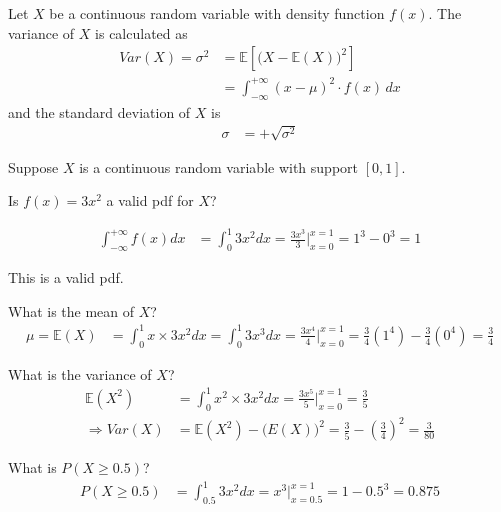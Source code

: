 \begin{definition}
Let $X$ be a continuous random variable with density function $f(x)$. 
The variance of $X$ is calculated as
\begin{align}
Var(X) = \sigma^{2} 	& = \mathbb{E}[ \big(X - \mathbb{E}(X) \big)^2 ] \\
				& = \int^{+ \infty}_{- \infty} (x - \mu)^{2} \cdot f(x) \, dx
\end{align}
\noindent
and the standard deviation of $X$ is 
\begin{align}
\sigma	& = + \sqrt{ \sigma^{2} }
\end{align}
\end{definition}

\begin{example}
Suppose $X$ is a continuous random variable with support $[0,1]$. 
\begin{benumerate}
\item Is $f(x) = 3x^2$ a valid pdf for $X$?

\begin{align*}
\int_{-\infty}^{+\infty} f(x) dx &= \int_{0}^{1} 3x^2dx 
	= \frac{3x^3}{3} \bigg|_{x=0}^{x=1} 
	= 1^{3} - 0^{3} = 1
\end{align*}

This is a valid pdf.

\item What is the mean of $X$?
\begin{align*}
\mu = \mathbb{E}(X) &= \int_{0}^{1} x \times 3 x^2 dx 
			  = \int_{0}^{1} 3 x^{3} dx 
			  = \frac{3 x^{4}}{4} \bigg|_{x=0}^{x=1}
			  = \frac{3}{4}(1^4) - \frac{3}{4}(0^4) = \frac{3}{4}
\end{align*}

\item What is the variance of $X$?
\begin{align*}
\mathbb{E}(X^2) &= \int_{0}^{1} x^2 \times 3 x^2 dx 
				= \frac{3x^5}{5} \bigg|_{x=0}^{x=1}
				= \frac{3}{5}\\
\Rightarrow Var(X) &= \mathbb{E}(X^2) - \bigg( E(X) \bigg)^2 
= \frac{3}{5} - \left( \frac{3}{4} \right)^2 = \frac{3}{80}
\end{align*}
\item What is $P(X \geq 0.5)$?
\begin{align*}
P(X \geq 0.5) &= \int_{0.5}^{1} 3x^2 dx 
			= x^3 \bigg|_{x=0.5}^{x=1} 
			= 1 - 0.5^3 
			= 0.875
\end{align*}
\end{benumerate}
\end{example}








